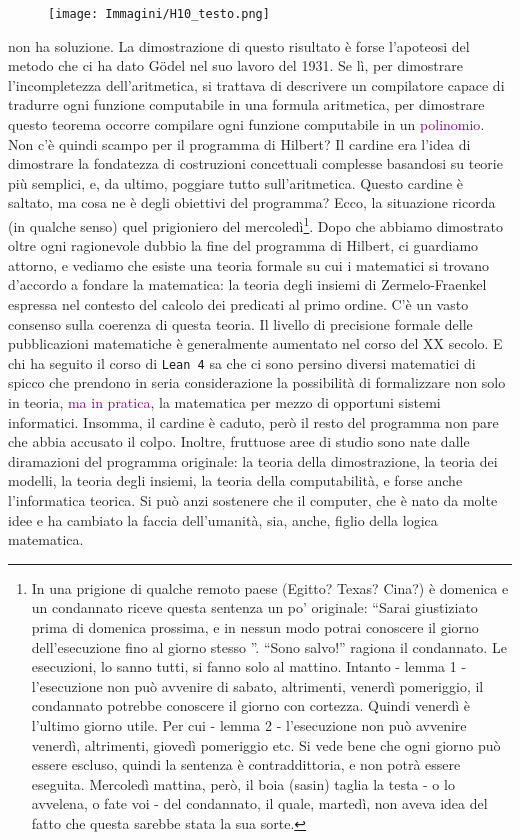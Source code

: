 \begin{figure}[h]
    \centering
    \texttt{[image: Immagini/H10\_testo.png]}
\end{figure}

non ha soluzione. La dimostrazione di questo risultato è forse l'apoteosi del metodo che ci ha dato Gödel nel suo lavoro del 1931.
Se lì, per dimostrare l'incompletezza dell'aritmetica, si trattava di descrivere un compilatore capace di tradurre ogni funzione computabile in una 
formula aritmetica, per dimostrare questo teorema occorre compilare ogni funzione computabile in un \textcolor{purple}{polinomio}.\\
Non c'è quindi scampo per il programma di Hilbert? Il cardine era l'idea di dimostrare la fondatezza di costruzioni concettuali complesse basandosi su teorie più semplici,
e, da ultimo, poggiare tutto sull'aritmetica. Questo cardine è saltato, ma cosa ne è degli obiettivi del programma? Ecco, la situazione ricorda (in qualche senso) quel prigioniero del mercoledì\footnote{In una prigione di qualche remoto
paese (Egitto? Texas? Cina?) è domenica e un condannato riceve questa sentenza un po' originale: ``Sarai giustiziato prima di domenica prossima, e in nessun modo potrai conoscere il giorno dell'esecuzione fino al giorno stesso ''. ``Sono salvo!'' ragiona
il condannato. Le esecuzioni, lo sanno tutti, si fanno solo al mattino. Intanto - lemma 1 - l'esecuzione non può avvenire di sabato, altrimenti, venerdì pomeriggio, il condannato potrebbe conoscere il giorno con cortezza. Quindi venerdì è l'ultimo giorno utile.
Per cui - lemma 2 - l'esecuzione non può avvenire venerdì, altrimenti, giovedì pomeriggio etc. Si vede bene che ogni giorno può essere escluso, quindi la sentenza è contraddittoria, e non potrà essere eseguita. Mercoledì mattina, però, il boia (sasin) taglia la testa - o lo avvelena,
o fate voi - del condannato, il quale, martedì, non aveva idea del fatto che questa sarebbe stata la sua sorte.}.
Dopo che abbiamo dimostrato oltre ogni ragionevole dubbio la fine del programma di Hilbert, ci guardiamo attorno, e vediamo che esiste una teoria formale su cui i matematici si trovano d'accordo
a fondare la matematica: la teoria degli insiemi di Zermelo-Fraenkel espressa nel contesto del calcolo dei predicati al primo ordine. C'è un vasto consenso sulla coerenza di questa teoria. Il livello 
di precisione formale delle pubblicazioni matematiche è generalmente aumentato nel corso del XX secolo. E chi ha seguito il corso di \texttt{Lean 4} sa che ci sono persino diversi matematici di spicco che prendono 
in seria considerazione la possibilità di formalizzare non solo in teoria, \textcolor{purple}{ma in pratica}, la matematica per mezzo di opportuni sistemi informatici.
Insomma, il cardine è caduto, però il resto del programma non pare che abbia accusato il colpo. Inoltre, fruttuose aree di studio sono nate dalle diramazioni del programma originale: la teoria della dimostrazione,
la teoria dei modelli, la teoria degli insiemi, la teoria della computabilità, e forse anche l'informatica teorica. Si può anzi sostenere che il computer, che è nato da molte idee e ha cambiato la faccia dell'umanità,
sia, anche, figlio della logica matematica.